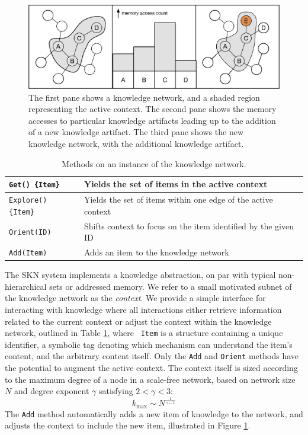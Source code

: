 \documentclass[11pt,letterpaper]{article}
\begin{document}
\begin{figure}[h]
\centering
\includegraphics[scale=.5]{sf_add.eps}
\caption{The first pane shows a knowledge network, and a shaded region
  representing the active context. The second pane shows the memory accesses
  to particular knowledge artifacts leading up to the addition of a new
  knowledge artifact. The third pane shows the new knowledge network, with
  the additional knowledge artifact.}
\label{fig:sf_add}
\end{figure}

\begin{table}[h]
  \begin{center}
  \begin{tabular}{|l|p{4in}|}
    \hline
    {\tt Get() \{Item\}}     & Yields the set of items in the active context \\
                               \hline
    {\tt Explore() \{Item\}} & Yields the set of items within one edge of
                               the active context \\ \hline
    {\tt Orient(ID)}         & Shifts context to focus on the item identified
                               by the given ID \\ \hline
    {\tt Add(Item)}          & Adds an item to the knowledge network \\ \hline
  \end{tabular}
  \end{center}
\caption{Methods on an instance of the knowledge network.}
\label{tab:sf_get}
\end{table}


The SKN system implements a knowledge abstraction, on par with typical
non-hierarchical sets or addressed memory. We refer to a small motivated
subnet of the knowledge network as the {\em context}. We provide a simple
interface for interacting with knowledge where all interactions either
retrieve information related to the current context or adjust the context
within the knowledge network, outlined in Table \ref{tab:sf_get}, where {\tt
Item} is a structure containing a unique identifier, a symbolic tag denoting
which mechanism can understand the item's content, and the arbitrary content
itself. Only the {\tt Add} and {\tt Orient} methods have the potential to
augment the active context. The context itself is sized according to the
maximum degree of a node in a scale-free network, based on network size $N$
and degree exponent $\gamma$ satisfying $2<\gamma<3$:
\[k_{\text{max}} \sim N^{\frac1{\gamma-1}}\]
The {\tt Add} method automatically adds a new item of
knowledge to the network, and adjusts the context to include the new item,
illustrated in Figure \ref{fig:sf_add}.
\end{document}

